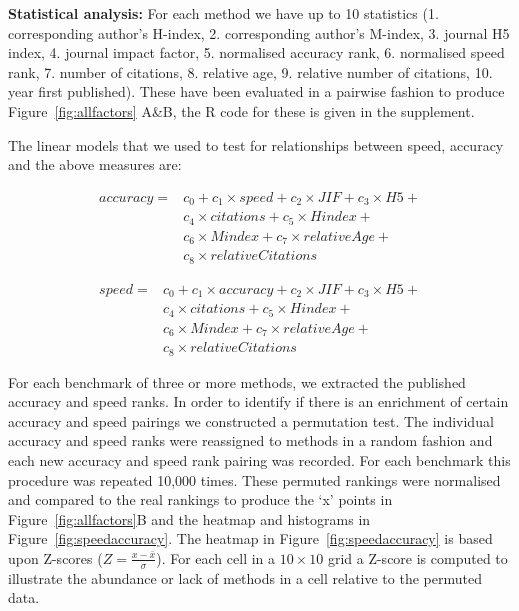 \documentclass[fleqn,10pt]{SelfArx} %
\begin{document}
\textbf{Statistical analysis:} For each method we have up to 10 statistics (1. corresponding author’s H-index, 2. corresponding author’s M-index, 3. journal H5 index, 4. journal impact factor, 5. normalised accuracy rank, 6. normalised speed rank, 7. number of citations, 8. relative age, 9. relative number of citations, 10. year first published). These have been evaluated in a pairwise fashion to produce Figure~\ref{fig:allfactors} A\&B, the R code for these is given in the supplement. 

The linear models that we used to test for relationships between speed, accuracy and the above measures are:

\begin{equation*}
\begin{split}
accuracy=& c_0+c_1\times speed+c_2\times JIF+c_3\times H5+\\
& c_4\times citations+c_5\times Hindex+\\
& c_6\times Mindex+c_7\times relativeAge+\\
& c_8\times relativeCitations
\end{split}
\end{equation*}

\begin{equation*}
\begin{split}
speed=& c_0+c_{1}\times accuracy+c_{2}\times JIF+c_{3}\times H5+\\
& c_{4}\times citations+c_{5}\times Hindex+\\
& c_{6}\times Mindex+c_{7}\times relativeAge+\\
& c_{8}\times relativeCitations
\end{split}
\end{equation*}


For each benchmark of three or more methods, we extracted the published accuracy and speed ranks. In order to identify if there is an enrichment of certain accuracy and speed pairings we constructed a permutation test. The individual accuracy and speed ranks were reassigned to methods in a random fashion and each new accuracy and speed rank pairing was recorded. For each benchmark this procedure was repeated 10,000 times. These permuted rankings were normalised and compared to the real rankings to produce the ‘x’ points in Figure~\ref{fig:allfactors}B and the heatmap and histograms in Figure~\ref{fig:speedaccuracy}. The heatmap in Figure~\ref{fig:speedaccuracy} is based upon Z-scores ($Z=\frac{x-\bar{x}}{\sigma}$). For each cell in a $10\times 10$ grid a Z-score is computed to illustrate the abundance or lack of methods in a cell relative to the permuted data.
\end{document}
